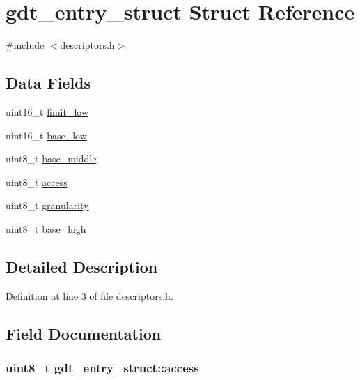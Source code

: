 \hypertarget{structgdt__entry__struct}{}\section{gdt\+\_\+entry\+\_\+struct Struct Reference}
\label{structgdt__entry__struct}


{\ttfamily \#include $<$descriptors.\+h$>$}

\subsection*{Data Fields}
\begin{DoxyCompactItemize}
\item 
uint16\+\_\+t \hyperlink{structgdt__entry__struct_a6bbf5ad7af7b8e8e7f7c26ec74d8c1b2}{limit\+\_\+low}
\item 
uint16\+\_\+t \hyperlink{structgdt__entry__struct_adba88eafea5f07167d181e4090cbcf49}{base\+\_\+low}
\item 
uint8\+\_\+t \hyperlink{structgdt__entry__struct_a986d46963d3ccdbec85b3749c1e09abf}{base\+\_\+middle}
\item 
uint8\+\_\+t \hyperlink{structgdt__entry__struct_ac07173385496c5b952e58ddc20f1cc99}{access}
\item 
uint8\+\_\+t \hyperlink{structgdt__entry__struct_a7fb7b3704e10434dbe64564416cf1a25}{granularity}
\item 
uint8\+\_\+t \hyperlink{structgdt__entry__struct_aa08eedea9c0f707b9fa052b7567879c7}{base\+\_\+high}
\end{DoxyCompactItemize}


\subsection{Detailed Description}


Definition at line 3 of file descriptors.\+h.



\subsection{Field Documentation}
\subsubsection[{\texorpdfstring{access}{access}}]{\setlength{\rightskip}{0pt plus 5cm}uint8\+\_\+t gdt\+\_\+entry\+\_\+struct\+::access}\hypertarget{structgdt__entry__struct_ac07173385496c5b952e58ddc20f1cc99}{}\label{structgdt__entry__struct_ac07173385496c5b952e58ddc20f1cc99}


